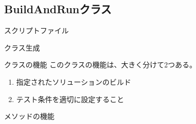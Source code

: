 
\subsection{BuildAndRunクラス}
\label{subsec:BuildAndRun}

\begin{Description}{スクリプトファイル}
\end{Description}

\medskip
\begin{Description}{クラス生成}
	\begin{Args}
	\end{Args}
\end{Description}

\begin{Description}{クラスの機能}
	このクラスの機能は、大きく分けて2つある。
	\begin{enumerate}
	  \item	指定されたソリューションのビルド
	  \item	テスト条件を適切に設定すること
	\end{enumerate}
\end{Description}

メソッドの機能


